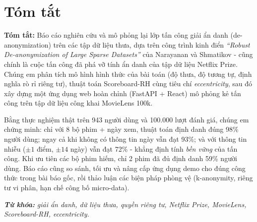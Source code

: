 \clearpage
{}
{}
\chapter*{Tóm tắt}

\noindent\textbf{Tóm tắt:}
Báo cáo nghiên cứu và mô phỏng lại lớp tấn công giải ẩn danh (de-anonymization) trên các tập dữ liệu thưa, dựa trên công trình kinh điển \textit{``Robust De-anonymization of Large Sparse Datasets''} của Narayanan và Shmatikov - cũng chính là cuộc tấn công đã phá vỡ tính ẩn danh của tập dữ liệu Netflix Prize. Chúng em phân tích mô hình hình thức của bài toán (độ thưa, độ tương tự, định nghĩa rò rỉ riêng tư), thuật toán Scoreboard-RH cùng tiêu chí \textit{eccentricity}, sau đó xây dựng một ứng dụng web hoàn chỉnh (FastAPI + React) mô phỏng kẻ tấn công trên tập dữ liệu công khai MovieLens 100k.

Bằng thực nghiệm thật trên 943 người dùng và 100.000 lượt đánh giá, chúng em chứng minh: chỉ với 8 bộ phim + ngày xem, thuật toán định danh đúng 98\% người dùng; ngay cả khi không có thông tin ngày vẫn đạt 93\%; và với thông tin nhiễu ($\pm 1$ điểm, $\pm 14$ ngày) vẫn đạt 72\% - khẳng định tính \textit{bền vững} của tấn công. Khi ưu tiên các bộ phim hiếm, chỉ 2 phim đã đủ định danh 59\% người dùng. Báo cáo cũng so sánh, tối ưu và nâng cấp ứng dụng demo cho đúng công thức trong bài báo gốc, rồi thảo luận các biện pháp phòng vệ (k-anonymity, riêng tư vi phân, hạn chế công bố micro-data).

\vspace{0.5cm}
\noindent\textit{\textbf{Từ khóa:}} \textit{giải ẩn danh, dữ liệu thưa, quyền riêng tư, Netflix Prize, MovieLens, Scoreboard-RH, eccentricity.}
